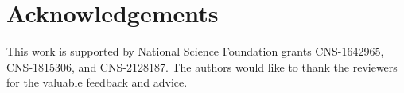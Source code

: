 \section{Acknowledgements}
This work is supported by National Science Foundation grants CNS-1642965, CNS-1815306, and CNS-2128187. The authors would like to thank the reviewers for the valuable feedback and advice.